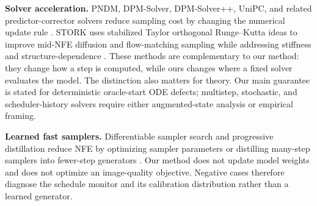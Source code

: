 \textbf{Solver acceleration.}
PNDM, DPM-Solver, DPM-Solver++, UniPC, and related predictor-corrector solvers
reduce sampling cost by changing the numerical update rule
\citep{liu2022pndm,lu2022dpmsolver,lu2025dpmsolverpp,zhao2023unipc}. STORK
uses stabilized Taylor orthogonal Runge--Kutta ideas to improve mid-NFE
diffusion and flow-matching sampling while addressing stiffness and
structure-dependence \citep{tan2025stork}. These methods are complementary to
our method: they change how a step is computed, while ours changes where a
fixed solver evaluates the model. The distinction also matters for theory. Our
main guarantee is stated for deterministic oracle-start ODE defects; multistep,
stochastic, and scheduler-history solvers require either augmented-state
analysis or empirical framing.

\textbf{Learned fast samplers.}
Differentiable sampler search and progressive distillation reduce NFE by
optimizing sampler parameters or distilling many-step samplers into fewer-step
generators \citep{watson2022fastsamplers,salimans2022progressive}. Our method
does not update model weights and does not optimize an image-quality objective.
Negative cases therefore diagnose the schedule monitor and its calibration
distribution rather than a learned generator.
